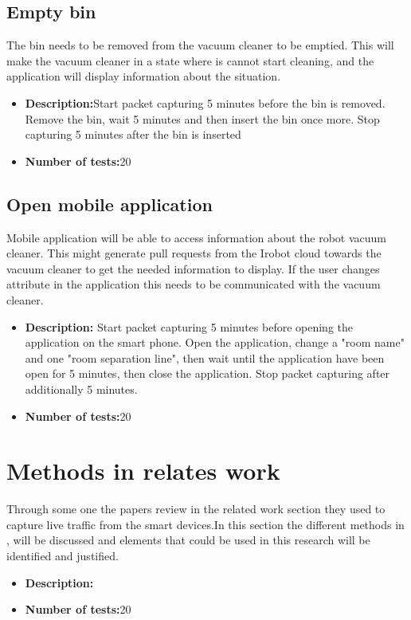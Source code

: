 \subsection{Empty bin} The bin needs to be removed from the vacuum cleaner to be emptied. This will make the vacuum cleaner in a state where is cannot start cleaning, and the application will display information about the situation. 

\begin{itemize}
    \item \textbf{Description:}Start packet capturing 5 minutes before the bin is removed. Remove the bin, wait 5 minutes and then insert the bin once more. Stop capturing 5 minutes after the bin is inserted
    \item \textbf{Number of tests:}20
\end{itemize}

\subsection{Open mobile application}
Mobile application will be able to access information about the robot vacuum cleaner. This might generate pull requests from the Irobot cloud towards the vacuum cleaner to get the needed information to display. If the user changes attribute in the application this needs to be communicated with the vacuum cleaner. 
\begin{itemize}
    \item \textbf{Description:} Start packet capturing 5 minutes before opening the application on the smart phone. Open the application, change a "room name" and one "room separation line", then wait until the application have been open for 5 minutes, then close the application. Stop packet capturing after additionally 5 minutes. 
    \item \textbf{Number of tests:}20
\end{itemize}



\section{Methods in relates work}
Through some one the papers review in the related work section they used to capture live traffic from the smart devices.In this section the different methods in \cite{lindaeavesdropping} \cite{eavsIoT} \cite{Neato}, will be discussed and elements that could be used in this research will be identified and justified. 


\begin{itemize}
    \item \textbf{Description:}
    \item \textbf{Number of tests:}20
\end{itemize}
